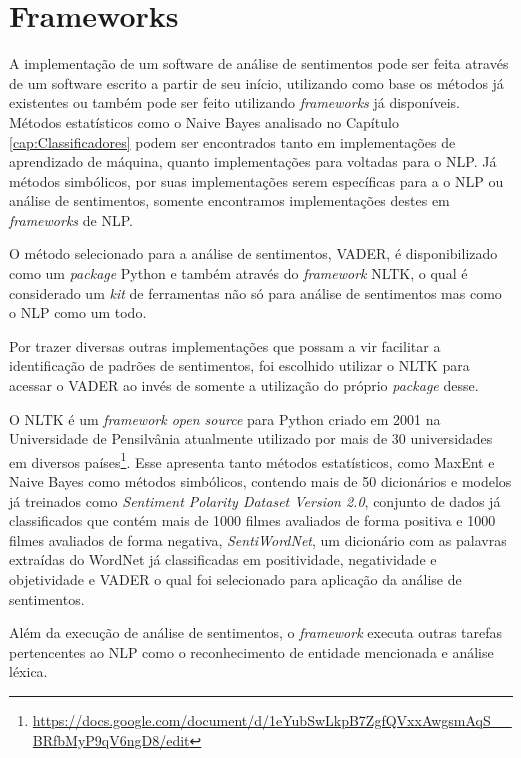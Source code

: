 \chapter{Frameworks}
\label{cap:Frameworks}

A implementação de um software de análise de sentimentos pode ser feita através
de um software escrito a partir de seu início, utilizando como base os métodos
já existentes ou também pode ser feito utilizando \textit{frameworks} já
disponíveis. Métodos estatísticos como o Naive Bayes analisado no Capítulo
\ref{cap:Classificadores} podem ser encontrados tanto em implementações de
aprendizado de máquina, quanto implementações para voltadas para o \ac{NLP}.
Já métodos simbólicos, por suas implementações serem específicas para a o
\ac{NLP} ou análise de sentimentos, somente encontramos implementações destes em
\textit{frameworks} de \ac{NLP}.

O método selecionado para a análise de sentimentos, \ac{VADER}, é
disponibilizado como um \textit{package} Python e também através do
\textit{framework} \ac{NLTK}, o qual é considerado um \textit{kit} de
ferramentas não só para análise de sentimentos mas como o \ac{NLP} como um todo.

Por trazer diversas outras implementações que possam a vir facilitar a
identificação de padrões de sentimentos, foi escolhido utilizar o \ac{NLTK} para
acessar o \ac{VADER} ao invés de somente a utilização do próprio
\textit{package} desse.

O \ac{NLTK} é um \textit{framework open source} para Python
criado em 2001 na Universidade de Pensilvânia atualmente utilizado por mais de
30 universidades em diversos
países\footnote{\url{https://docs.google.com/document/d/1eYubSwLkpB7ZgfQVxxAwgsmAqS__BRfbMyP9qV6ngD8/edit}}.
Esse apresenta tanto métodos estatísticos, como \ac{MaxEnt} e Naive Bayes como métodos simbólicos, contendo
mais de 50 dicionários e modelos já treinados como \textit{Sentiment Polarity Dataset Version 2.0}, conjunto de dados já classificados que contém mais de 1000 filmes avaliados de forma positiva e 1000 filmes avaliados de forma negativa, \textit{SentiWordNet},
um dicionário com as palavras extraídas do WordNet já classificadas em
positividade, negatividade e objetividade e \ac{VADER} o qual foi selecionado
para aplicação da análise de sentimentos.

Além da execução de análise de sentimentos, o \textit{framework} executa outras
tarefas pertencentes ao \ac{NLP} como o reconhecimento de entidade mencionada e
análise léxica.


